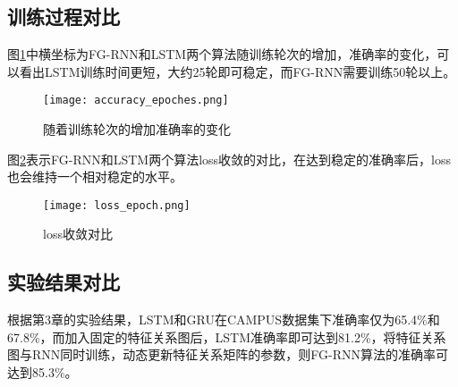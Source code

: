 \subsection{训练过程对比}
图\ref{fig:随着训练轮次的增加准确率的变化}中横坐标为FG-RNN和LSTM两个算法随训练轮次的增加，准确率的变化，可以看出LSTM训练时间更短，大约25轮即可稳定，而FG-RNN需要训练50轮以上。

\begin{figure}[H]
    \centering
    \texttt{[image: accuracy\_epoches.png]}
    \caption{随着训练轮次的增加准确率的变化}
    \label{fig:随着训练轮次的增加准确率的变化}
  \end{figure}

图\ref{fig:loss收敛对比}表示FG-RNN和LSTM两个算法loss收敛的对比，在达到稳定的准确率后，loss也会维持一个相对稳定的水平。
  \begin{figure}[H]
    \centering
    \texttt{[image: loss\_epoch.png]}
    \caption{loss收敛对比}
    \label{fig:loss收敛对比}
  \end{figure}

\subsection{实验结果对比}

根据第3章的实验结果，LSTM和GRU在CAMPUS数据集下准确率仅为65.4\%和67.8\%，而加入固定的特征关系图后，LSTM准确率即可达到81.2\%，将特征关系图与RNN同时训练，动态更新特征关系矩阵的参数，则FG-RNN算法的准确率可达到85.3\%。







